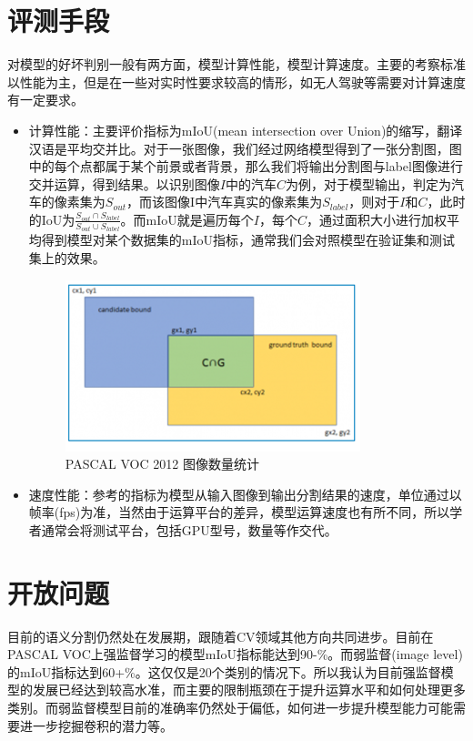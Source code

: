 \documentclass{article}
\begin{document}
\begin{CJK}{UTF8}{gbsn}
\section{评测手段}
对模型的好坏判别一般有两方面，模型计算性能，模型计算速度。主要的考察标准以性能为主，但是在一些对实时性要求较高的情形，如无人驾驶等需要对计算速度有一定要求。
\begin{itemize}
    \item 计算性能：主要评价指标为mIoU(mean intersection over Union)的缩写，翻译汉语是平均交并比。对于一张图像，我们经过网络模型得到了一张分割图，图中的每个点都属于某个前景或者背景，那么我们将输出分割图与label图像进行交并运算，得到结果。以识别图像$I$中的汽车$C$为例，对于模型输出，判定为汽车的像素集为$S_{out}$，而该图像I中汽车真实的像素集为$S_{label}$，则对于$I$和$C$，此时的IoU为$\frac{S_{out}\cap S_{label}}{S_{out}\cup S_{label}}$。而mIoU就是遍历每个$I$，每个$C$，通过面积大小进行加权平均得到模型对某个数据集的mIoU指标，通常我们会对照模型在验证集和测试集上的效果。
    \begin{figure}[h]
    \centering
    \includegraphics[scale=0.8]{imgs/3-3_IoU.png}
    \caption{PASCAL VOC 2012 图像数量统计}
    \label{VOC statistic}
\end{figure}
    \item 速度性能：参考的指标为模型从输入图像到输出分割结果的速度，单位通过以帧率(fps)为准，当然由于运算平台的差异，模型运算速度也有所不同，所以学者通常会将测试平台，包括GPU型号，数量等作交代。
\end{itemize}

\section{开放问题}
目前的语义分割仍然处在发展期，跟随着CV领域其他方向共同进步。目前在PASCAL VOC上强监督学习的模型mIoU指标能达到90-\%。而弱监督(image level)的mIoU指标达到60+\%。这仅仅是20个类别的情况下。所以我认为目前强监督模型的发展已经达到较高水准，而主要的限制瓶颈在于提升运算水平和如何处理更多类别。而弱监督模型目前的准确率仍然处于偏低，如何进一步提升模型能力可能需要进一步挖掘卷积的潜力等。


\end{CJK}
\end{document}
